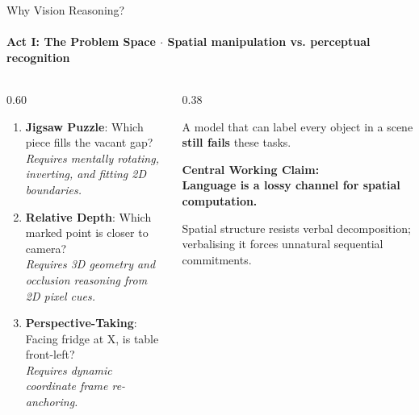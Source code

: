\documentclass[aspectratio=169, 10pt]{beamer}
\begin{document}
\begin{frame}{Why Vision Reasoning?}
  \framesubtitle{Act I: The Problem Space $\cdot$ Spatial manipulation vs. perceptual recognition}
  
  \begin{columns}[T]
    \begin{column}{0.60\textwidth}
      \begin{tcolorbox}[metriccard, title=\textbf{Three Canonical Failure Modes}]
        \begin{enumerate}\setlength{\itemsep}{5pt}
          \item \textbf{Jigsaw Puzzle}: Which piece fills the vacant gap?\\
          \textit{\scriptsize Requires mentally rotating, inverting, and fitting 2D boundaries.}
          \item \textbf{Relative Depth}: Which marked point is closer to camera?\\
          \textit{\scriptsize Requires 3D geometry and occlusion reasoning from 2D pixel cues.}
          \item \textbf{Perspective-Taking}: Facing fridge at X, is table front-left?\\
          \textit{\scriptsize Requires dynamic coordinate frame re-anchoring.}
        \end{enumerate}
      \end{tcolorbox}
    \end{column}
    
    \begin{column}{0.38\textwidth}
      \begin{tcolorbox}[alertcard, title=\textbf{Perception $\neq$ Reasoning}]
        \small
        A model that can label every object in a scene \textbf{still fails} these tasks.
        \vspace{6pt}
        
        \textbf{Central Working Claim:}\\
        \alert{\textbf{Language is a lossy channel for spatial computation.}}
      \end{tcolorbox}
      \vspace{4pt}
      \begin{tcolorbox}[metriccard]
        \scriptsize Spatial structure resists verbal decomposition; verbalising it forces unnatural sequential commitments.
      \end{tcolorbox}
    \end{column}
  \end{columns}

\end{frame}
\end{document}
